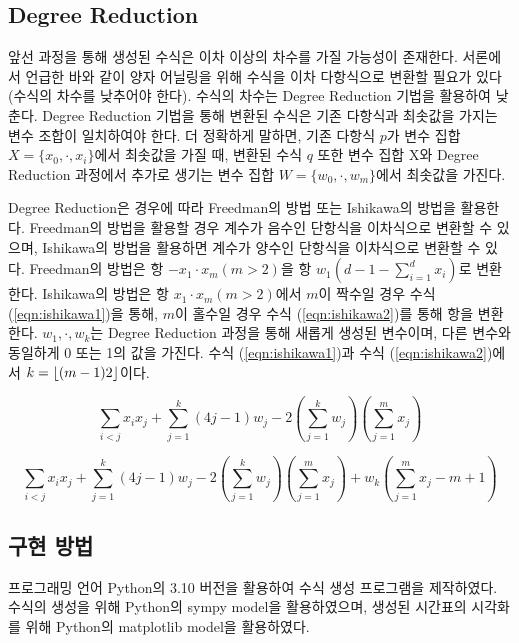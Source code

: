 \documentclass{article}
\begin{document}
    \subsection{Degree Reduction}

앞선 과정을 통해 생성된 수식은 이차 이상의 차수를 가질 가능성이 존재한다. 서론에서 언급한 바와 같이 양자 어닐링을 위해 수식을 이차 다항식으로 변환할 필요가 있다(수식의 차수를 낮추어야 한다). 수식의 차수는 Degree Reduction 기법을 활용하여 낮춘다. Degree Reduction 기법을 통해 변환된 수식은 기존 다항식과 최솟값을 가지는 변수 조합이 일치하여야 한다. 더 정확하게 말하면, 기존 다항식 $p$가 변수 집합 $X=\{x_{0},\cdot,x_{i} \}$에서 최솟값을 가질 때, 변환된 수식 $q$ 또한 변수 집합 X와 Degree Reduction 과정에서 추가로 생기는 변수 집합 $W=\{w_{0},\cdot,w_{m} \}$에서 최솟값을 가진다.

Degree Reduction은 경우에 따라 Freedman의 방법 또는 Ishikawa의 방법을 활용한다. Freedman의 방법을 활용할 경우 계수가 음수인 단항식을 이차식으로 변환할 수 있으며\cite{freedman2005energy}, Ishikawa의 방법을 활용하면 계수가 양수인 단항식을 이차식으로 변환할 수 있다. \cite{ishikawa2010transformation} Freedman의 방법은 항 $-x_{1}\cdot x_{m} (m>2)$을 항 $w_{1} (d-1-\sum_{i=1}^{d}x_{i} )$로 변환한다. Ishikawa의 방법은 항 $x_{1}\cdot x_{m} (m>2)$에서 $m$이 짝수일 경우 수식 (\ref{eqn:ishikawa1})을 통해, $m$이 홀수일 경우 수식 (\ref{eqn:ishikawa2})를 통해 항을 변환한다. $w_{1},\cdot,w_{k}$는 Degree Reduction 과정을 통해 새롭게 생성된 변수이며, 다른 변수와 동일하게 0 또는 1의 값을 가진다. 수식 (\ref{eqn:ishikawa1})과 수식 (\ref{eqn:ishikawa2})에서 $k = \lfloor (m-1)\/2 \rfloor$이다. 

    \begin{equation}\label{eqn:ishikawa1}
        \sum_{i<j}x_{i}  x_{j}+\sum_{j=1}^{k}(4j-1) w_{j} -2\left( \sum_{j=1}^{k}w_{j} \right) \left ( \sum_{j=1}^{m}x_{j} \right )
    \end{equation}

    \begin{equation}\label{eqn:ishikawa2}
            \sum_{i<j}x_{i}  x_{j}+\sum_{j=1}^{k} (4j-1) w_{j} - 2\left ( \sum_{j=1}^{k}w_{j} \right) \left(\sum_{j=1}^{m}x_{j} \right)+w_{k} \left (\sum_{j=1}^{m}x_{j} -m+1\right )
    \end{equation}

    \subsection{구현 방법}

프로그래밍 언어 Python의 3.10 버전을 활용하여 수식 생성 프로그램을 제작하였다. 수식의 생성을 위해 Python의 sympy model을 활용하였으며, 생성된 시간표의 시각화를 위해 Python의 matplotlib model을 활용하였다. 
\end{document}
